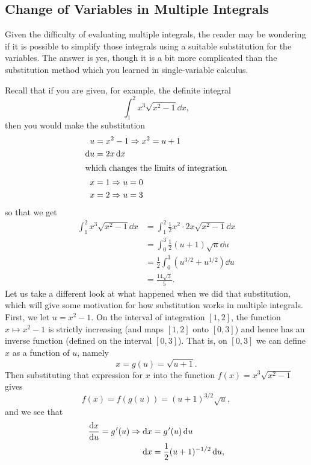 
\subsection{Change of Variables in Multiple Integrals}

Given the difficulty of evaluating multiple integrals, the reader may be wondering if it is possible to simplify those integrals using a suitable substitution for the variables. The answer is yes, though it is a bit more complicated than the substitution method which you learned in single-variable calculus.

Recall that if you are given, for example, the definite integral
\[\int_1^2 x^3 \sqrt{x^2 - 1}\dd x ,\]
then you would make the substitution
\begin{align*}
u &= x^2 - 1 \Rightarrow x^2 = u + 1\\
\operatorname{d}\! u &= 2x\operatorname{d}\! x\\
\intertext{which changes the limits of integration}
x &= 1 \Rightarrow u = 0\\
x &= 2 \Rightarrow u = 3
\end{align*}
so that we get
\begin{align*}
 \int_1^2 x^3 \sqrt{x^2 - 1}\dd x &= \int_1^2 \frac12 x^2 \cdot 2x \sqrt{x^2 - 1}\dd x\\
 &= \int_0^3 \frac12 (u+1)\sqrt{u}\dd u\\
 &= \frac12 \int_0^3 \left( u^{3/2} + u^{1/2} \right)\dd u \\
 &= \frac{14\sqrt3}5 .
\end{align*}
Let us take a different look at what happened when we did that substitution, which will give some motivation for how substitution works in multiple integrals. First, we let $u = x^2 - 1$. On the interval of integration $[ 1,2 ]$, the function $x \mapsto x^2 - 1$ is strictly increasing (and maps $[ 1,2 ]$ onto $[ 0,3 ]$) and hence has an inverse function (defined on the interval $[ 0,3 ]$). That is, on $[ 0,3 ]$ we can define $x$ as a function of $u$, namely
\[x = g(u) = \sqrt{u+1} .\]
Then substituting that expression for $x$ into the function $f(x) = x^3 \sqrt{x^2 - 1}$ gives
\[f(x) = f(g(u)) = (u+1)^{3/2} \sqrt{u} ,\]
and we see that
\begin{align*}
 \frac{\dd x}{\dd u} = g\primeskip'(u) \Rightarrow \dd x &= g\primeskip'(u)\dd u\\
 \dd x &= \frac12 (u+1)^{-1/2}\dd u ,
\end{align*}
